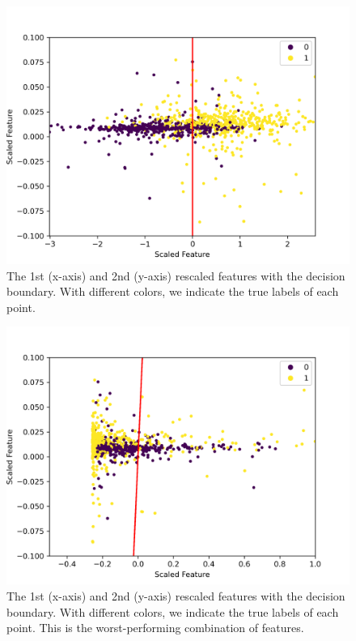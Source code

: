 \documentclass[a4paper,10pt]{article}
\begin{document}
\begin{figure}[H]
  \centering
  \includegraphics[width=.8\linewidth]{./plots/boundary_2-4.png}
  \caption{The 1st (x-axis) and 2nd (y-axis) rescaled features with the decision boundary. With different colors, we indicate the true labels of each point.}
  \label{fig:boun_2_4}
\end{figure}

\begin{figure}[H]
  \centering
  \includegraphics[width=.8\linewidth]{./plots/boundary_3-4.png}
  \caption{The 1st (x-axis) and 2nd (y-axis) rescaled features with the decision boundary. With different colors, we indicate the true labels of each point. This is the worst-performing combination of features.}
  \label{fig:boun_3_4}
\end{figure}



\end{document}
